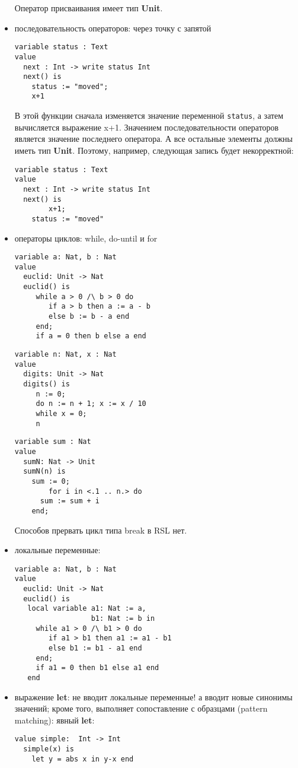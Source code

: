 \begin{itemize}
Оператор присваивания имеет тип \textbf{Unit}.

\item последовательность операторов: через точку с запятой
\begin{lstlisting}
variable status : Text
value
  next : Int -> write status Int
  next() is
	status := "moved";
	x+1	
\end{lstlisting}
В этой функции сначала изменяется значение переменной \texttt{status}, а затем вычисляется выражение x+1. Значением последовательности операторов является значение последнего оператора. А все остальные элементы должны иметь тип \textbf{Unit}. Поэтому, например, следующая запись будет некорректной:
\begin{lstlisting}
variable status : Text
value
  next : Int -> write status Int
  next() is
        x+1;
	status := "moved"
\end{lstlisting}

\item операторы циклов: while, do-until и for
\begin{lstlisting}
variable a: Nat, b : Nat
value
  euclid: Unit -> Nat
  euclid() is
     while a > 0 /\ b > 0 do
        if a > b then a := a - b
        else b := b - a end
     end;
     if a = 0 then b else a end
\end{lstlisting}

\begin{lstlisting}
variable n: Nat, x : Nat
value
  digits: Unit -> Nat
  digits() is
     n := 0;
     do n := n + 1; x := x / 10
     while x = 0;
     n
\end{lstlisting}

\begin{lstlisting}
variable sum : Nat
value
  sumN: Nat -> Unit
  sumN(n) is
	sum := 0;
        for i in <.1 .. n.> do
	  sum := sum + i
	end;
\end{lstlisting}

Способов прервать цикл типа break в RSL нет.

\item локальные переменные:
\begin{lstlisting}
variable a: Nat, b : Nat
value
  euclid: Unit -> Nat
  euclid() is
   local variable a1: Nat := a,
                  b1: Nat := b in
     while a1 > 0 /\ b1 > 0 do
        if a1 > b1 then a1 := a1 - b1
        else b1 := b1 - a1 end
     end;
     if a1 = 0 then b1 else a1 end
   end
\end{lstlisting}

\item выражение \textbf{let}: не вводит локальные переменные! а вводит новые синонимы значений; кроме того, выполняет сопоставление с образцами (pattern matching):
явный \textbf{let}:
\begin{lstlisting}
value simple:  Int -> Int
  simple(x) is
    let y = abs x in y-x end
\end{lstlisting}


\end{itemize}
